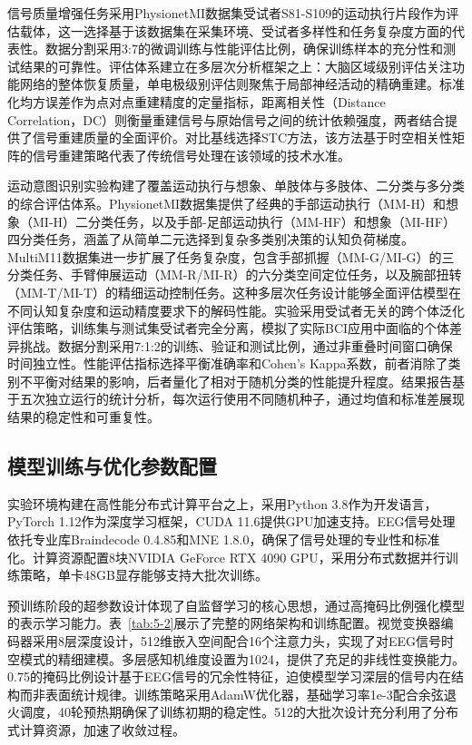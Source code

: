 信号质量增强任务采用PhysionetMI数据集受试者S81-S109的运动执行片段作为评估载体，这一选择基于该数据集在采集环境、受试者多样性和任务复杂度方面的代表性。数据分割采用3:7的微调训练与性能评估比例，确保训练样本的充分性和测试结果的可靠性。评估体系建立在多层次分析框架之上：大脑区域级别评估关注功能网络的整体恢复质量，单电极级别评估则聚焦于局部神经活动的精确重建。标准化均方误差作为点对点重建精度的定量指标，距离相关性（Distance Correlation，DC）则衡量重建信号与原始信号之间的统计依赖强度，两者结合提供了信号重建质量的全面评价。对比基线选择STC方法\cite{bahador2021reconstruction}，该方法基于时空相关性矩阵的信号重建策略代表了传统信号处理在该领域的技术水准。

运动意图识别实验构建了覆盖运动执行与想象、单肢体与多肢体、二分类与多分类的综合评估体系。PhysionetMI数据集提供了经典的手部运动执行（MM-H）和想象（MI-H）二分类任务，以及手部-足部运动执行（MM-HF）和想象（MI-HF）四分类任务，涵盖了从简单二元选择到复杂多类别决策的认知负荷梯度。MultiM11数据集进一步扩展了任务复杂度，包含手部抓握（MM-G/MI-G）的三分类任务、手臂伸展运动（MM-R/MI-R）的六分类空间定位任务，以及腕部扭转（MM-T/MI-T）的精细运动控制任务。这种多层次任务设计能够全面评估模型在不同认知复杂度和运动精度要求下的解码性能。实验采用受试者无关的跨个体泛化评估策略，训练集与测试集受试者完全分离，模拟了实际BCI应用中面临的个体差异挑战。数据分割采用7:1:2的训练、验证和测试比例，通过非重叠时间窗口确保时间独立性。性能评估指标选择平衡准确率和Cohen's Kappa系数，前者消除了类别不平衡对结果的影响，后者量化了相对于随机分类的性能提升程度。结果报告基于五次独立运行的统计分析，每次运行使用不同随机种子，通过均值和标准差展现结果的稳定性和可重复性。


\subsection{模型训练与优化参数配置}
实验环境构建在高性能分布式计算平台之上，采用Python 3.8作为开发语言，PyTorch 1.12作为深度学习框架，CUDA 11.6提供GPU加速支持。EEG信号处理依托专业库Braindecode 0.4.85和MNE 1.8.0，确保了信号处理的专业性和标准化。计算资源配置8块NVIDIA GeForce RTX 4090 GPU，采用分布式数据并行训练策略，单卡48GB显存能够支持大批次训练。

预训练阶段的超参数设计体现了自监督学习的核心思想，通过高掩码比例强化模型的表示学习能力。表~\ref{tab:5-2}展示了完整的网络架构和训练配置。视觉变换器编码器采用8层深度设计，512维嵌入空间配合16个注意力头，实现了对EEG信号时空模式的精细建模。多层感知机维度设置为1024，提供了充足的非线性变换能力。0.75的掩码比例设计基于EEG信号的冗余性特征，迫使模型学习深层的信号内在结构而非表面统计规律。训练策略采用AdamW优化器，基础学习率1e-3配合余弦退火调度，40轮预热期确保了训练初期的稳定性。512的大批次设计充分利用了分布式计算资源，加速了收敛过程。



